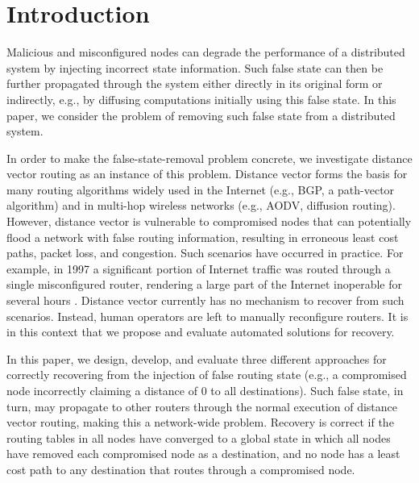 
\section{Introduction}
\label{sec:intro}


Malicious and misconfigured nodes can degrade the performance of a distributed system by injecting incorrect state information. Such false state can then be further propagated 
through the system either directly in its original form or indirectly, e.g., by diffusing computations initially using this false state.  In this paper, we consider 
the problem of removing such false state from a distributed system.

In order to make the false-state-removal problem concrete, we investigate distance vector routing as an instance of this problem. Distance vector forms the basis for many routing 
algorithms widely used in the Internet (e.g., BGP, a path-vector algorithm) and in multi-hop wireless networks (e.g., AODV, diffusion routing). However, distance vector is vulnerable 
to compromised nodes that can potentially flood a network with false routing information, resulting in erroneous least cost paths, packet loss, and congestion. Such scenarios have occurred in practice. 
For example, in 1997 a significant portion of Internet traffic was routed through a single misconfigured router, rendering a large part of the Internet inoperable for several hours \cite{Neumann97}. 
Distance vector currently has no mechanism to recover from such scenarios. Instead, human operators are left to manually reconfigure routers. It is in this context that we propose and
evaluate automated solutions for recovery.

In this paper, we design, develop, and evaluate three different approaches for correctly recovering from the injection of false routing state (e.g., a compromised node incorrectly
claiming a distance of $0$ to all destinations). Such false state, in turn, may propagate to other routers through the normal execution of distance vector routing, making this
a network-wide problem. Recovery is correct if the routing tables in all nodes have converged to a global state in which all nodes have removed each compromised node as a destination,
and no node has a least cost path to any destination that routes through a compromised node.

